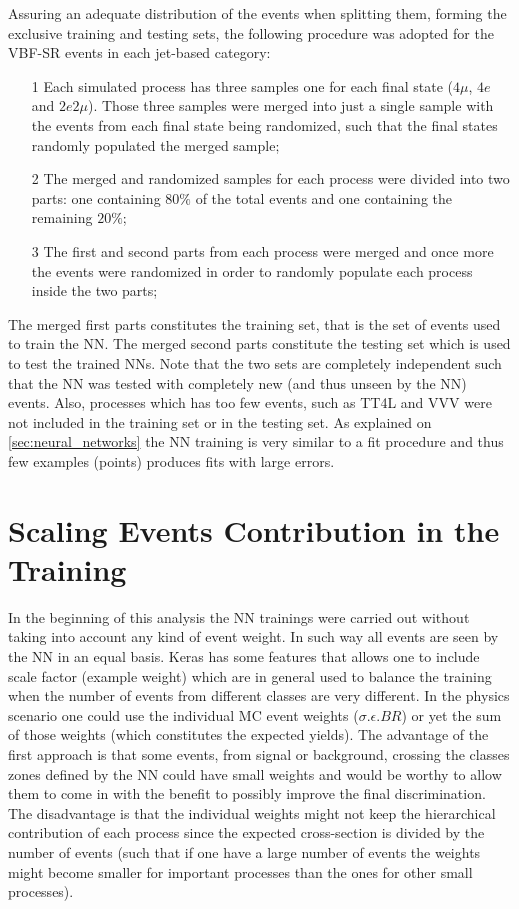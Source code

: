 Assuring an adequate distribution of the events when splitting them, forming the exclusive training and testing sets, the following procedure was adopted for the VBF-SR events in each jet-based category:
\begin{itemize}
	\item[1] Each simulated process has three samples one for each final state ($4\mu$, $4e$ and $2e2\mu$). Those three samples were merged into just a single sample with the events from each final state being randomized, such that the final states randomly populated the merged sample;
	\item[2] The merged and randomized samples for each process were divided into two parts: one containing $80\%$ of the total events and one containing the remaining $20\%$;
	\item[3] The first and second parts from each process were merged and once more the events were randomized in order to randomly populate each process inside the two parts;
\end{itemize}

The merged first parts constitutes the training set, that is the set of events used to train the NN. The merged second parts constitute the testing set which is used to test the trained NNs. Note that the two sets are completely independent such that the NN was tested with completely new (and thus unseen by the NN) events. Also, processes which has too few events, such as TT4L and VVV were not included in the training set or in the testing set. As explained on \ref{sec:neural_networks} the NN training is very similar to a fit procedure and thus few examples (points) produces fits with large errors.

\section{Scaling Events Contribution in the Training}
\label{subsec:scale_train}
In the beginning of this analysis the NN trainings were carried out without taking into account any kind of event weight. In such way all events are seen by the NN in an equal basis. Keras has some features that allows one to include scale factor (example weight) which are in general used to balance the training when the number of events from different classes are very different. In the physics scenario one could use the individual MC event weights ($\sigma.\epsilon.BR$) or yet the sum of those weights (which constitutes the expected yields). The advantage of the first approach is that some events, from signal or background, crossing the classes zones defined by the NN could have small weights and would be worthy to allow them to come in with the benefit to possibly improve  the final discrimination. The disadvantage is that the individual weights might not keep the hierarchical contribution of each process since the expected cross-section is divided by the number of events (such that if one have a large number of events the weights might become smaller for important processes than the ones for other small processes).

